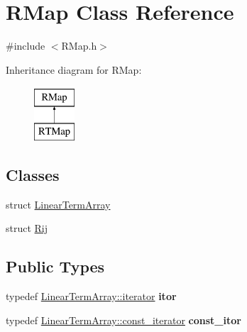 \hypertarget{classRMap}{}\section{R\+Map Class Reference}
\label{classRMap}


{\ttfamily \#include $<$R\+Map.\+h$>$}

Inheritance diagram for R\+Map\+:\begin{figure}[H]
\begin{center}
\leavevmode
\includegraphics[height=2.000000cm]{classRMap}
\end{center}
\end{figure}
\subsection*{Classes}
\begin{DoxyCompactItemize}
\item 
struct \hyperlink{structRMap_1_1LinearTermArray}{Linear\+Term\+Array}
\item 
struct \hyperlink{structRMap_1_1Rij}{Rij}
\end{DoxyCompactItemize}
\subsection*{Public Types}
\begin{DoxyCompactItemize}
\item 
\mbox{\label{classRMap_a4acf6f498514f84fb15fcba5b0b39912}} 
typedef \hyperlink{structRMap_1_1Rij}{Linear\+Term\+Array\+::iterator} {\bfseries itor}
\item 
\mbox{\label{classRMap_a4fce8e330b7ea653ef5f1fe54ac2dc19}} 
typedef \hyperlink{structRMap_1_1Rij}{Linear\+Term\+Array\+::const\+\_\+iterator} {\bfseries const\+\_\+itor}
\end{DoxyCompactItemize}
